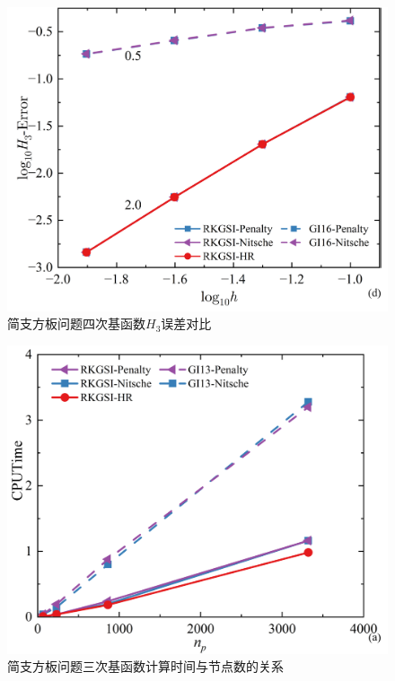 \begin{figure}[H]
    \centering
    \includegraphics[scale=0.5]{figure/PHR/R/QH3.png}
    \caption{简支方板问题四次基函数$H_3$误差对比}\label{RQLH}
\end{figure}
\newpage
\begin{figure}[H]
    \centering
    \includegraphics[scale=0.5]{figure/PHR/R/Ccputime.png}
    \caption{简支方板问题三次基函数计算时间与节点数的关系}\label{RCcputime}
\end{figure}
